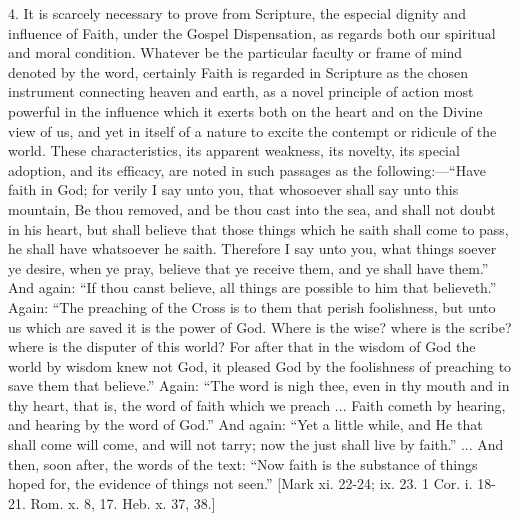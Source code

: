 4. It is scarcely necessary to prove from Scripture, the especial
dignity and influence of Faith, under the Gospel Dispensation, as
regards both our spiritual and moral condition. Whatever be the
particular faculty or frame of mind denoted by the word, certainly
Faith is regarded in Scripture as the chosen instrument connecting
heaven and earth, as a novel principle of action most powerful in the
influence which it exerts both on the heart and on the Divine view of
us, and yet in itself of a nature to excite the contempt or ridicule
of the world. These characteristics, its apparent weakness, its
novelty, its special adoption, and its efficacy, are noted in such
passages as the following:—``Have faith in God; for verily I say
unto you, that whosoever shall say unto this mountain, Be thou
removed, and be thou cast into the sea, and shall not doubt in his
heart, but shall believe that those things which he saith shall come
to pass, he shall have whatsoever he saith. Therefore I say unto you,
what things soever ye desire, when ye pray, believe that ye receive
them, and ye shall have them.'' And again: ``If thou canst
believe, all things are possible to him that believeth.'' Again:
``The preaching of the Cross is to them that perish foolishness,
but unto us which are saved it is the power of God. Where is the wise?
where is the scribe? where is the disputer of this world? For after
that in the wisdom of God the world by wisdom knew not God, it pleased
God by the foolishness of preaching to save them that believe.''
Again: ``The word is nigh thee, even in thy mouth and in thy
heart, that is, the word of faith which we preach ... Faith cometh by
hearing, and hearing by the word of God.'' And again: ``Yet a
little while, and He that shall come will come, and will not tarry;
now the just shall live by faith.'' ... And then, soon after, the
words of the text: ``Now faith is the substance of things hoped
for, the evidence of things not seen.'' [Mark xi. 22-24; ix. 23. 1
Cor. i. 18-21. Rom. x. 8, 17. Heb. x. 37, 38.]

